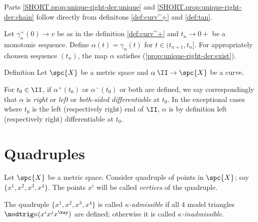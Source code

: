  Parts \ref{SHORT.prop:unique-right-der:unique} and \ref{SHORT.prop:unique-right-der:chain} follow directly from definitons \ref{def:curv^+} and \ref{def:tan}.

Let $\gamma^+_n(0)\to v$ be as in the definition \ref{def:curv^+} and $t_n\to0+$ be a monotonic sequence.
Define $\alpha(t)=\gamma_n(t)$ for $t\in (t_{n+1},t_n]$.
For appropriately chousen sequence $(t_n)$, the map $\alpha$ satisfies (\ref{prop:unique-right-der:exist}).
\qeds



\begin{thm}{Definition}\label{def:diff-curv}
Let 
$\spc{X}$ be a metric space 
and $\alpha\:\II\to \spc{X}$ be a curve.

For $t_0\in\II$, 
if $\alpha^+(t_0)$ or $\alpha^-(t_0)$ or both are defined,
we say correspondingly that  $\alpha$ is \emph{right} or \emph{left} or \emph{both-sided differentiable} at $t_0$.
In the exceptional cases where $t_0$ is the left (respectively right) end of $\II$, $\alpha$ is by definition left (respectively right) differentiable at $t_0$.
\end{thm}

























\section{Quadruples}\label{sec:quad}

Let $\spc{X}$ be a metric space.
Consider quadruple of points in $\spc{X}$;
say $\{x^1,x^2,x^3,x^4\}$.
The points $x^i$ will be called \emph{vertices} of the quadruple.

The quadruple $\{x^1,x^2,x^3,x^4\}$
is called \emph{$\kappa$-admissible} if all 4 model triangles 
$\modtrig\kappa(x^ix^jx^\kay)$ are defined;
otherwise it is called \emph{$\kappa$-inadmissible}.

